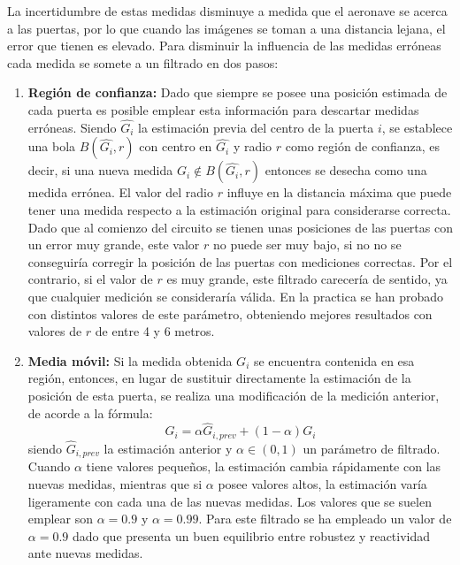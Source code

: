 La incertidumbre de estas medidas disminuye a medida que el aeronave se acerca a las puertas, por lo que cuando las imágenes se toman a una distancia lejana, el error que tienen es elevado. Para disminuir la influencia de las medidas erróneas cada medida se somete a un filtrado en dos pasos:

\begin{enumerate}
	\item \textbf{Región de confianza:} Dado que siempre se posee una posición estimada de cada puerta es posible emplear esta información para descartar medidas erróneas. Siendo $\hat{G_i}$ la estimación previa del centro de la puerta $i$, se establece una bola $B(\hat{G_i},r)$ con centro en $\hat{G_i}$  y radio $r$ como región de confianza, es decir, si una nueva medida $G_i \notin B(\hat{G_i},r)$ entonces se desecha como una medida errónea.
	El valor del radio $r$ influye en la distancia máxima que puede tener una medida respecto a la estimación original para considerarse correcta. Dado que al comienzo del circuito se tienen unas posiciones de las puertas con un error muy grande, este valor $r$ no puede ser muy bajo, si no no se conseguiría corregir la posición de las puertas con mediciones correctas. Por el contrario, si el valor de $r$ es muy grande, este filtrado carecería de sentido, ya que cualquier medición se consideraría válida. En la practica se han probado con distintos valores de este parámetro, obteniendo mejores resultados con valores de $r$ de entre 4 y 6 metros.
	\item \textbf{Media móvil:} Si la medida obtenida $G_i$ se encuentra contenida en esa región, entonces, en lugar de sustituir directamente la estimación de la posición de esta puerta, se realiza una modificación de la medición anterior, de acorde a la fórmula:
	\begin{equation}
		\hat{G_i} = \alpha \hat{G}_{i,prev} + (1-\alpha)G_i
	\end{equation}
	siendo $\hat{G}_{i,prev}$ la estimación anterior y $\alpha \in (0,1)$ un parámetro de filtrado. Cuando $\alpha$ tiene valores pequeños, la estimación cambia rápidamente con las nuevas medidas, mientras que si $\alpha$ posee valores altos, la estimación varía ligeramente con cada una de las nuevas medidas. Los valores que se suelen emplear son $\alpha = 0.9$ y $\alpha = 0.99$. Para este filtrado se ha empleado un valor de $\alpha = 0.9$ dado que presenta un buen equilibrio entre robustez y reactividad ante nuevas medidas.

\end{enumerate}


